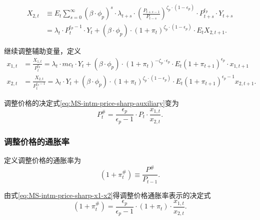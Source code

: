 \begin{equation}
\label{eq:MS-intm-auxiliary-X2}
\begin{split}
X_{2,t} &\equiv E_t \sum_{s=0}^{\infty}  \left(\beta \cdot \phi_p \right)^s \cdot \lambda_{t+s} \cdot \left(\frac{P_{t+s-1}}{P_{t-s}}\right)^{\zeta_p \cdot \left(1-\epsilon_p \right)} \cdot P_{t+s}^{\epsilon_p} \cdot Y_{t+s} \\
&=\lambda_t \cdot P_{t}^{\epsilon_p -1} \cdot Y_t + \left(\beta \cdot \phi_p \right) \cdot
\left(1 + \pi_t \right)^{\zeta_p \cdot \left( 1 - \epsilon_p \right)} \cdot E_t X_{2,t+1}.
\end{split}
\end{equation}

继续调整辅助变量，定义
\begin{align}
\label{eq:MS-intm-auxiliary-x1}
x_{1,t} &= \frac{X_{1,t}}{P_t^{\epsilon_p}}
=\lambda_t \cdot mc_t \cdot Y_t +\left( \beta \cdot \phi_p \right) \cdot \left( 1+\pi_t \right)^{-\zeta_p \cdot \epsilon_p} \cdot E_t \left( 1+\pi_{t+1} \right)^{\epsilon_p} \cdot x_{1,t+1} \\
\label{eq:MS-intm-auxiliary-x2}
x_{2,t} &= \frac{X_{2,t}}{P_{t}^{\epsilon_p -1}} = \lambda_t \cdot Y_t + \left(\beta \cdot \phi_p \right) \cdot
\left(1 + \pi_t \right)^{\zeta_p \cdot \left( 1 - \epsilon_p \right)} \cdot E_t \left( 1 + \pi_{t+1} \right)^{\epsilon_p -1} x_{2,t+1}.
\end{align}

调整价格的决定式\eqref{eq:MS-intm-price-sharp-auxiliary}变为
\begin{equation}
\label{eq:MS-intm-price-sharp-x1-x2}
P^{\#}_t = \frac{\epsilon_p}{\epsilon_p -1} \cdot P_t \cdot \frac{x_{1,t}}{x_{2,t}}.
\end{equation}

\subsubsection{调整价格的通胀率}
定义调整价格的通胀率为
\begin{equation}
\label{eq:MS-intm-reset-price-inflation-def}
\left(1+\pi_t^{\#}\right) \equiv \frac{P^{\#}}{P_{t-1}}.
\end{equation}

由式\eqref{eq:MS-intm-price-sharp-x1-x2}得调整价格通胀率表示的决定式
\begin{equation}
\label{eq:MS-intm-price-sharp-inflation-x1-x2}
\left( 1+\pi^{\#}_t \right) = \frac{\epsilon_p}{\epsilon_p -1} \cdot \left(1 + \pi_t \right)\cdot \frac{x_{1,t}}{x_{2,t}}.
\end{equation}

